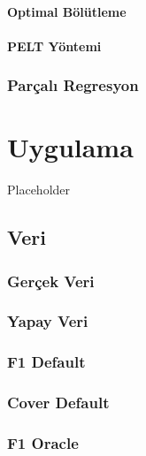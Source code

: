\documentclass[12pt,twoside]{deuthesis}
\begin{document}
\hypertarget{optimal-buxf6luxfctleme}{%
\subsubsection{Optimal Bölütleme}\label{optimal-buxf6luxfctleme}}

\hypertarget{pelt-yuxf6ntemi}{%
\subsubsection{PELT Yöntemi}\label{pelt-yuxf6ntemi}}

\hypertarget{paruxe7alux131-regresyon}{%
\subsection{Parçalı Regresyon}\label{paruxe7alux131-regresyon}}

\hypertarget{Bolum3}{%
\chapter{Uygulama}\label{Bolum3}}

Placeholder

\hypertarget{veri}{%
\section{Veri}\label{veri}}

\hypertarget{geruxe7ek-veri}{%
\subsection{Gerçek Veri}\label{geruxe7ek-veri}}

\hypertarget{yapay-veri}{%
\subsection{Yapay Veri}\label{yapay-veri}}

\hypertarget{f1-default}{%
\subsection{F1 Default}\label{f1-default}}

\hypertarget{cover-default}{%
\subsection{Cover Default}\label{cover-default}}

\hypertarget{f1-oracle}{%
\subsection{F1 Oracle}\label{f1-oracle}}
\end{document}
